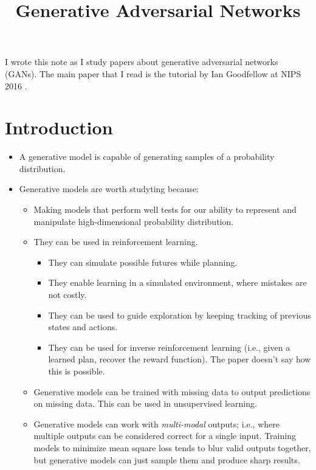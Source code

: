 \documentclass[10pt]{article}
\title{Generative Adversarial Networks}
\begin{document}
  \maketitle

  I wrote this note as I study papers about generative adversarial networks (GANs). The main paper that I read is the tutorial by Ian Goodfellow at NIPS 2016 \cite{Goodfellow:2016}.

  \section{Introduction}

  \begin{itemize}
  	\item A generative model is capable of generating samples of a probability distribution.

  	\item Generative models are worth studyting because:

  	\begin{itemize}
  	  \item Making models that perform well tests for our ability to represent and manipulate high-dimensional probability distribution.

  	  \item They can be used in reinforcement learning.

  	  \begin{itemize}
  	  	\item They can simulate possible futures while planning.

  	  	\item They enable learning in a simulated environment, where mistakes are not costly.

  	  	\item They can be used to guide exploration by keeping tracking of previous states and actions.

  	  	\item They can be used for inverse reinforcement learning (i.e., given a learned plan, recover the reward function). The paper doesn't say how this is possible.
  	  \end{itemize}

  	  \item Generative models can be trained with missing data to output predictions on missing data. This can be used in unsupervised learning.

  	  \item Generative models can work with \emph{multi-modal} outputs; i.e., where multiple outputs can be considered correct for a single input. Training models to minimize mean square loss tends to blur valid outputs together, but generative models can just sample them and produce sharp results.


\end{itemize}
\end{itemize}
\end{document}
